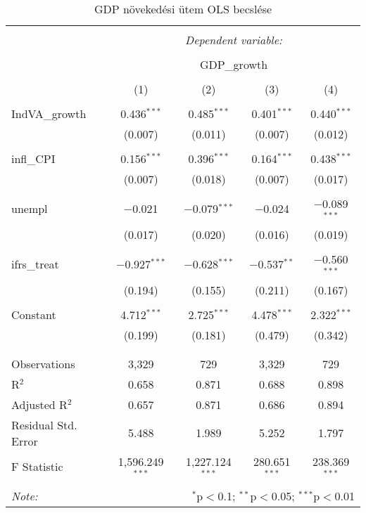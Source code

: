
\begin{table}[!htbp] \centering 
  \caption{GDP növekedési ütem OLS becslése} 
  \label{} 
\begin{tabular}{@{\extracolsep{5pt}}lcccc} 
\\[-1.8ex]\hline 
\hline \\[-1.8ex] 
 & \multicolumn{4}{c}{\textit{Dependent variable:}} \\ 
\cline{2-5} 
\\[-1.8ex] & \multicolumn{4}{c}{GDP\_growth} \\ 
\\[-1.8ex] & (1) & (2) & (3) & (4)\\ 
\hline \\[-1.8ex] 
 IndVA\_growth & 0.436$^{***}$ & 0.485$^{***}$ & 0.401$^{***}$ & 0.440$^{***}$ \\ 
  & (0.007) & (0.011) & (0.007) & (0.012) \\ 
  & & & & \\ 
 infl\_CPI & 0.156$^{***}$ & 0.396$^{***}$ & 0.164$^{***}$ & 0.438$^{***}$ \\ 
  & (0.007) & (0.018) & (0.007) & (0.017) \\ 
  & & & & \\ 
 unempl & $-$0.021 & $-$0.079$^{***}$ & $-$0.024 & $-$0.089$^{***}$ \\ 
  & (0.017) & (0.020) & (0.016) & (0.019) \\ 
  & & & & \\ 
 ifrs\_treat & $-$0.927$^{***}$ & $-$0.628$^{***}$ & $-$0.537$^{**}$ & $-$0.560$^{***}$ \\ 
  & (0.194) & (0.155) & (0.211) & (0.167) \\ 
  & & & & \\ 
 Constant & 4.712$^{***}$ & 2.725$^{***}$ & 4.478$^{***}$ & 2.322$^{***}$ \\ 
  & (0.199) & (0.181) & (0.479) & (0.342) \\ 
  & & & & \\ 
\hline \\[-1.8ex] 
Observations & 3,329 & 729 & 3,329 & 729 \\ 
R$^{2}$ & 0.658 & 0.871 & 0.688 & 0.898 \\ 
Adjusted R$^{2}$ & 0.657 & 0.871 & 0.686 & 0.894 \\ 
Residual Std. Error & 5.488 & 1.989 & 5.252 & 1.797 \\ 
F Statistic & 1,596.249$^{***}$ & 1,227.124$^{***}$ & 280.651$^{***}$ & 238.369$^{***}$ \\ 
\hline 
\hline \\[-1.8ex] 
\textit{Note:}  & \multicolumn{4}{r}{$^{*}$p$<$0.1; $^{**}$p$<$0.05; $^{***}$p$<$0.01} \\ 
\end{tabular} 
\end{table} 
